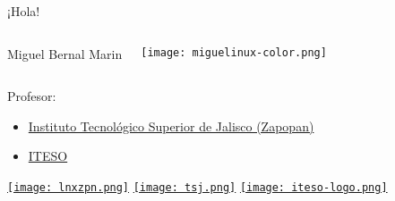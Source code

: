 
\begin{frame}[c]{¡Hola!}

  \begin{columns}
      Miguel Bernal Marin

      \vspace{\baselineskip}

      \texttt{[image: miguelinux-color.png]}
  \end{columns}

  Profesor:
  \begin{itemize}
    \item \href{https://tsj.mx/}{Instituto Tecnológico Superior
      de Jalisco (Zapopan)}
    \item \href{https://iteso.mx/}{ITESO}
  \end{itemize}

  \vspace{\baselineskip}
    \href{https://t.me/linuxeroszapopan}{\texttt{[image: lnxzpn.png]}}
    \hspace{1cm}
    \href{https://tecmm.edu.mx/}{\texttt{[image: tsj.png]}}
    \hspace{1cm}
    \href{https://iteso.mx/}{\texttt{[image: iteso-logo.png]}}
\end{frame}
